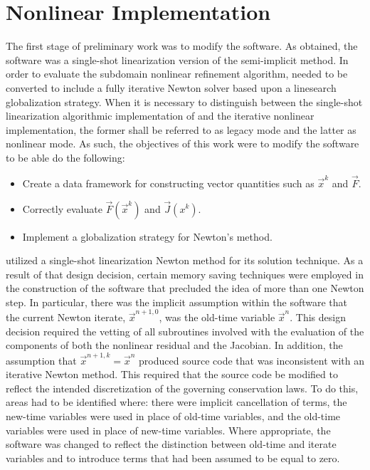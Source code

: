\section{Nonlinear \cobra{} Implementation}
\label{sect:nl_cobra}
The first stage of preliminary work was to modify the \cobra{} software.
As obtained, the \cobra{} software was a single-shot linearization version of the semi-implicit method.
In order to evaluate the subdomain nonlinear refinement algorithm, \cobra{} needed to be converted to include a fully iterative Newton solver based upon a linesearch globalization strategy.
When it is necessary to distinguish between the single-shot linearization algorithmic implementation of \cobra{} and the iterative nonlinear \cobra{} implementation, the former shall be referred to as legacy mode and the latter as nonlinear mode.
As such, the objectives of this work were to modify the software to be able do the following:

\begin{itemize}
\item{Create a data framework for constructing vector quantities such as $\vec{x}^{k}$ and $\vec{F}$.}
\item{Correctly evaluate $\vec{F}(\vec{x}^{k})$ and $\vec{J}(x^{k})$.}
\item{Implement a globalization strategy for Newton's method.}
\end{itemize}

\cobra{} utilized a single-shot linearization Newton method for its solution technique.
As a result of that design decision, certain memory saving techniques were employed in the construction of the software that precluded the idea of more than one Newton step.
In particular, there was the implicit assumption within the software that the current Newton iterate, $\vec{x}^{n+1, 0}$, was the old-time variable $\vec{x}^{n}$.
This design decision required the vetting of all subroutines involved with the evaluation of the components of both the nonlinear residual and the Jacobian.
In addition, the assumption that $\vec{x}^{n+1, k} = \vec{x}^{n}$ produced source code that was inconsistent with an iterative Newton method.
This required that the source code be modified to reflect the intended discretization of the governing conservation laws.
To do this, areas had to be identified where: there were implicit cancellation of terms, the new-time variables were used in place of old-time variables, and the old-time variables were used in place of new-time variables.
Where appropriate, the software was changed to reflect the distinction between old-time and iterate variables and to introduce terms that had been assumed to be equal to zero.

